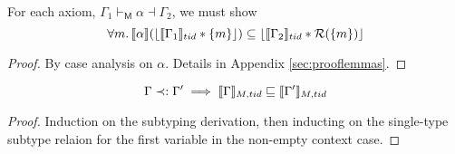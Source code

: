 \begin{lemma}
  \label{lem:axmsoundness}
For each axiom, $\Gamma_{1} \vdash_{\textsf{M}} \alpha \dashv \Gamma_{2}$, we must show
\[
\forall m\ldotp   \llbracket \alpha \rrbracket  (\lfloor \llbracket \Gamma_{1} \rrbracket_{tid}  * \{m\} \rfloor )\subseteq  \lfloor \llbracket \Gamma_{2} \rrbracket_{tid} * \mathcal{R}(\{m\}) \rfloor
\]
\end{lemma}
\begin{proof}
By case analysis on $\alpha$. Details in Appendix \ref{sec:prooflemmas}. %
\end{proof}
\begin{lemma}\label{lem:cntxsubt-mcln}
\[ \Gamma \prec: \Gamma'  \implies \llbracket \Gamma \rrbracket_{M,tid} \sqsubseteq \llbracket  \Gamma' \rrbracket_{M,tid} \]
\end{lemma}
\begin{proof}
Induction on the subtyping derivation, then inducting on the single-type subtype relaion for the first variable in the non-empty context case.
\end{proof}


